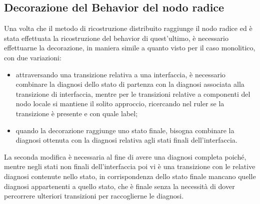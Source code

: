 \subsection{Decorazione del Behavior del nodo radice}
Una volta che il metodo di ricostruzione distribuito raggiunge il nodo radice ed è stata effettuata la ricostruzione del behavior di quest'ultimo, è necessario effettuarne la decorazione, in maniera simile a quanto visto per il caso monolitico, con due variazioni:
\begin{itemize}
\item attraversando una transizione relativa a una interfaccia, è necessario combinare la diagnosi dello stato di partenza con la diagnosi associata alla transizione di interfaccia, mentre per le transizioni relative a componenti del nodo locale si mantiene il solito approccio, ricercando nel ruler se la transizione è presente e con quale label;
\item quando la decorazione raggiunge uno stato finale, bisogna combinare la diagnosi ottenuta con la diagnosi relativa agli stati finali dell'interfaccia.
\end{itemize}
La seconda modifica è necessaria al fine di avere una diagnosi completa poiché, mentre negli stati non finali dell'interfaccia poi vi è una transizione con le relative diagnosi contenute nello stato, in corrispondenza dello stato finale mancano quelle diagnosi appartenenti a quello stato, che è finale senza la necessità di dover percorrere ulteriori transizioni per raccoglierne le diagnosi.